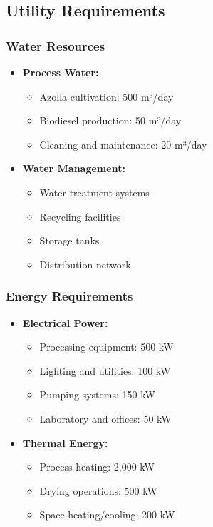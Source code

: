 \subsection{Utility Requirements}

\subsubsection{Water Resources}
\begin{itemize}
    \item \textbf{Process Water:}
    \begin{itemize}
        \item Azolla cultivation: 500 m³/day
        \item Biodiesel production: 50 m³/day
        \item Cleaning and maintenance: 20 m³/day
    \end{itemize}
    
    \item \textbf{Water Management:}
    \begin{itemize}
        \item Water treatment systems
        \item Recycling facilities
        \item Storage tanks
        \item Distribution network
    \end{itemize}
\end{itemize}

\subsubsection{Energy Requirements}
\begin{itemize}
    \item \textbf{Electrical Power:}
    \begin{itemize}
        \item Processing equipment: 500 kW
        \item Lighting and utilities: 100 kW
        \item Pumping systems: 150 kW
        \item Laboratory and offices: 50 kW
    \end{itemize}
    
    \item \textbf{Thermal Energy:}
    \begin{itemize}
        \item Process heating: 2,000 kW
        \item Drying operations: 500 kW
        \item Space heating/cooling: 200 kW
    \end{itemize}
\end{itemize}

